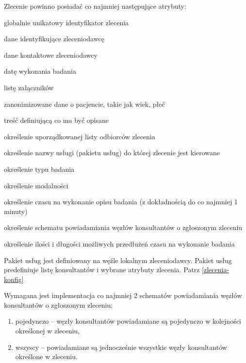 \documentclass[a4paper]{report}
\begin{document}
Zlecenie powinno posiadać co najmniej następujące atrybuty:
\begin{enumerate*}
\item globalnie unikatowy identyfikator zlecenia
\item dane identyfikujące zleceniodawcę
\item dane kontaktowe zleceniodawcy
\item datę wykonania badania
\item listę załączników 
\item zanonimizowane dane o pacjencie, takie jak wiek, płeć
\item treść definiującą co ma być opisane
\item określenie uporządkowanej listy odbiorców zlecenia
\item określenie nazwy usługi (pakietu usług) do której zlecenie jest kierowane
\item określenie typu badania
\item określenie modalności
\item określenie czasu na wykonanie opisu badania (z dokładnością do co najmniej 1 minuty)
\item określenie schematu powiadamiania węzłów konsultantów o zgłoszonym zleceniu 
\item określenie ilości i długości możliwych przedłużeń czasu na wykonanie badania
\end{enumerate*}

Pakiet usług jest definiowany na węźle lokalnym zleceniodawcy. Pakiet usług predefiniuje listę konsultantów i wybrane atrybuty zlecenia. Patrz \ref{zlecenia-konfig}

Wymagana jest implementacja co najmniej 2 schematów powiadamiania węzłów konsultantów o zgłoszonym zleceniu:
\begin{enumerate}
 \item pojedynczo -- węzły konsultantów powiadamiane są pojedynczo w kolejności określonej w zleceniu,
 \item wszyscy -- powiadamiane są jednocześnie wszystkie węzły konsultantów określone w zleceniu.
\end{enumerate}
\end{document}
